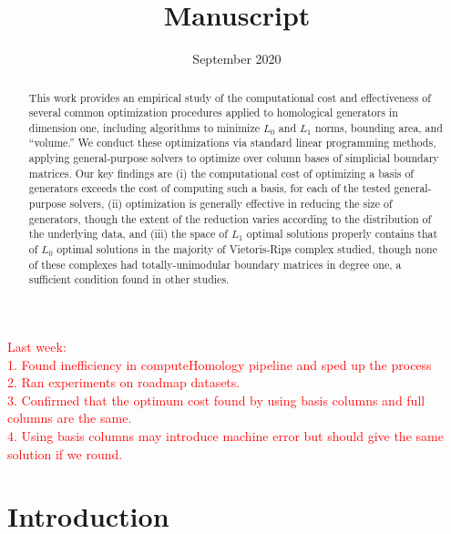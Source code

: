 \documentclass[11pt]{article}
\title{Manuscript}
\author{}
\date{September 2020}
\begin{document}
\maketitle
\begin{abstract}
    This work provides an empirical study of the computational cost and effectiveness of several common optimization procedures applied to homological generators in dimension one, including algorithms to minimize $L_0$ and $L_1$ norms, bounding area, and “volume.” We conduct these optimizations via standard linear programming methods, applying general-purpose solvers to optimize over column bases of simplicial boundary matrices. Our key findings are (i) the computational cost of optimizing a basis of generators exceeds the cost of computing such a basis, for each of the tested general-purpose solvers, (ii) optimization is generally effective in reducing the size of generators, though the extent of the reduction varies according to the distribution of the underlying data, and (iii)  the space of $L_1$ optimal solutions properly contains that of $L_0$ optimal solutions in the majority of Vietoris-Rips complex studied, though none of these complexes had totally-unimodular boundary matrices in degree one, a sufficient condition found in other studies.
\end{abstract}

\textcolor{red}{
Last week:\\
1. Found inefficiency in computeHomology pipeline and sped up the process \\
2. Ran experiments on roadmap datasets. \\
3. Confirmed that the optimum cost found by using basis columns and full columns are the same.\\
4. Using basis columns may introduce machine error but should give the same solution if we round. }

\section{Introduction}
\end{document}
